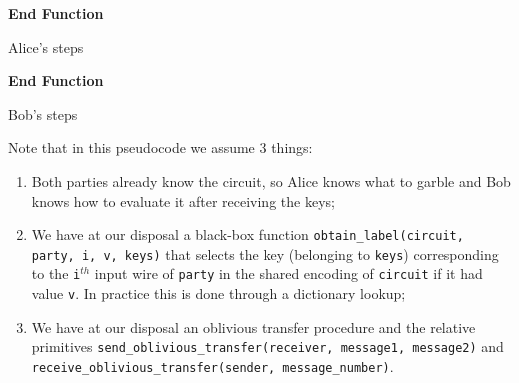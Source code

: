 \documentclass[12pt]{article}
\begin{document}
\begin{algorithm}[H]
  \SetAlgoLined
    \textbf{End Function}
   \caption{Alice's steps}\label{alg:alice}
  \end{algorithm}

\begin{algorithm}[H]
  \SetAlgoLined
    \textbf{End Function}
   \caption{Bob's steps}\label{alg:bob}
\end{algorithm}

Note that in this pseudocode we assume 3 things:

\begin{enumerate}
  \item Both parties already know the circuit, so Alice knows what to garble and Bob knows how to evaluate it after receiving the keys;
  \item We have at our disposal a black-box function \texttt{obtain\_label(circuit, party, i, v, keys)} that selects the key (belonging to \texttt{keys}) corresponding to the \texttt{i}$^{th}$ input wire of \texttt{party} in the shared encoding of \texttt{circuit} if it had value \texttt{v}. In practice this is done through a dictionary lookup;
  \item We have at our disposal an oblivious transfer procedure and the relative primitives \texttt{send\_oblivious\_transfer(receiver, message1, message2)} and \\\texttt{receive\_oblivious\_transfer(sender, message\_number)}.
\end{enumerate}
\end{document}
